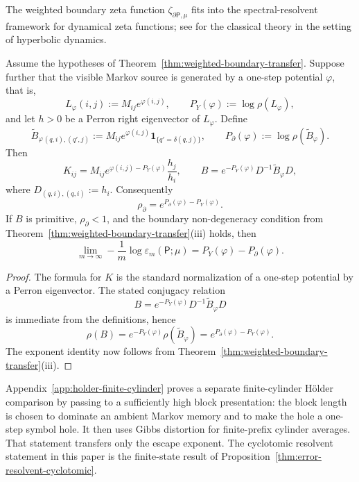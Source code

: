 \begin{remark}
The weighted boundary zeta function
\(\zeta_{\partial\mathsf{P},\mu}\) fits into the spectral-resolvent
framework for dynamical zeta functions; see
\citet{ParryPollicott1990} for the classical theory in the setting of
hyperbolic dynamics.
\end{remark}

\begin{corollary}
\label{cor:pressure-gap}
Assume the hypotheses of
Theorem~\ref{thm:weighted-boundary-transfer}.  Suppose further that the
visible Markov source is generated by a one-step potential \(\varphi\),
that is,
\[
  L_\varphi(i,j):=M_{ij}e^{\varphi(i,j)},
  \qquad
  P_Y(\varphi):=\log\rho(L_\varphi),
\]
and let \(h>0\) be a Perron right eigenvector of \(L_\varphi\).  Define
\[
  \widetilde B_\varphi{}_{(q,i),(q',j)}
  := M_{ij}e^{\varphi(i,j)}
     \mathbf{1}_{\{q'=\delta(q,j)\}},
  \qquad
  P_\partial(\varphi):=\log\rho(\widetilde B_\varphi).
\]
Then
\[
  K_{ij}
  = M_{ij}e^{\varphi(i,j)-P_Y(\varphi)}\frac{h_j}{h_i},
  \qquad
  B = e^{-P_Y(\varphi)}D^{-1}\widetilde B_\varphi D,
\]
where \(D_{(q,i),(q,i)}:=h_i\).  Consequently
\[
  \rho_\partial
  = e^{P_\partial(\varphi)-P_Y(\varphi)}.
\]
If \(B\) is primitive, \(\rho_\partial<1\), and the boundary
non-degeneracy condition from
Theorem~\ref{thm:weighted-boundary-transfer}(iii) holds, then
\[
  \lim_{m\to\infty}
  -\frac{1}{m}\log \varepsilon_m(\mathsf{P};\mu)
  = P_Y(\varphi)-P_\partial(\varphi).
\]
\end{corollary}

\begin{proof}
The formula for \(K\) is the standard normalization of a one-step
potential by a Perron eigenvector.  The stated conjugacy relation
\[
  B = e^{-P_Y(\varphi)}D^{-1}\widetilde B_\varphi D
\]
is immediate from the definitions, hence
\[
  \rho(B)=e^{-P_Y(\varphi)}\rho(\widetilde B_\varphi)
  = e^{P_\partial(\varphi)-P_Y(\varphi)}.
\]
The exponent identity now follows from
Theorem~\ref{thm:weighted-boundary-transfer}(iii).
\end{proof}

\begin{remark}
Appendix~\ref{app:holder-finite-cylinder} proves a separate
finite-cylinder H\"older comparison by passing to a sufficiently high
block presentation: the block length is chosen to dominate an ambient
Markov memory and to make the hole a one-step symbol hole.  It then uses
Gibbs distortion for finite-prefix cylinder averages.  That statement
transfers only the escape exponent.  The cyclotomic resolvent statement
in this paper is the finite-state result of
Proposition~\ref{thm:error-resolvent-cyclotomic}.
\end{remark}
